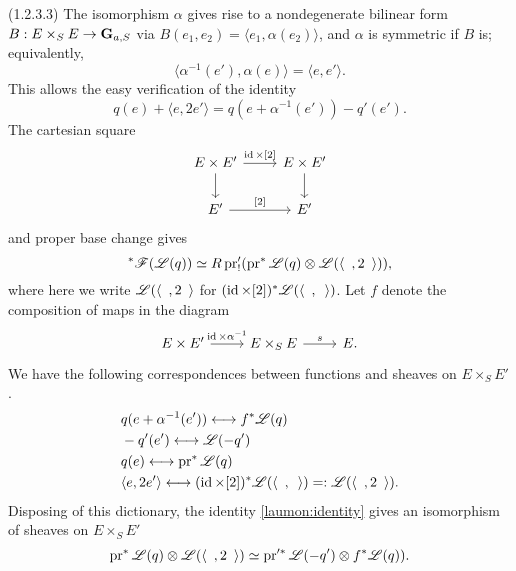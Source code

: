 \documentclass[deligne.tex]{subfiles}
\begin{document}
(1.2.3.3)
The isomorphism $\alpha$ gives rise to a nondegenerate bilinear form
$B:E\times_S E\rightarrow\mathbf{G}_{a,S}$ via $B(e_1,e_2)=\langle e_1,\alpha(e_2)\rangle$,
and $\alpha$ is symmetric if $B$ is; equivalently,
\begin{equation*}
	\langle \alpha^{-1}(e'),\alpha(e)\rangle=\langle e,e'\rangle.
\end{equation*}
This allows the easy verification of the identity
\begin{equation*}\label{laumon:identity}\tag{$\dagger$}
	q(e)+\langle e,2e'\rangle=q(e+\alpha^{-1}(e'))-q'(e').
\end{equation*}
The cartesian square
\begin{equation*}\begin{tikzcd}
	E\times E'\arrow[r,"{\id\times[2]}"]\arrow[d]&E\times E'\arrow[d] \\
	E'\arrow[r,"{[2]}"]&E'
\end{tikzcd}\end{equation*}
and proper base change gives
\begin{equation*}
	[2]^*\mathscr F(\mathscr L(q))\simeq
	R\pr_!'(\pr^*\mathscr L(q)\otimes\mathscr L(\langle\enskip,2\enskip\rangle)),
\end{equation*}
where here we write $\mathscr L(\langle\enskip,2\enskip\rangle$ for
$(\operatorname{id}\times[2])^*\mathscr L(\langle\enskip,\enskip\rangle)$.
Let $f$ denote the composition of maps in the diagram
\begin{equation*}\begin{tikzcd}
	E\times E'\arrow[r,"\id\times\alpha^{-1}"]&E\times_SE\arrow[r,"s"]&E.
\end{tikzcd}\end{equation*}
We have the following correspondences between functions and sheaves on
$E\times_SE'$.
\begin{align*}
	&q(e+\alpha^{-1}(e'))\longleftrightarrow f^*\mathscr L(q) \\
	&-q'(e')\longleftrightarrow\mathscr L(-q') \\
	&q(e)\longleftrightarrow\operatorname{pr}^*\mathscr L(q) \\
	&\langle e,2e'\rangle\longleftrightarrow(\operatorname{id}\times[2])^*\mathscr L(\langle\enskip,\enskip\rangle)=:\mathscr L(\langle\enskip,2\enskip\rangle).
\end{align*}
Disposing of this dictionary, the identity \eqref{laumon:identity} gives an 
isomorphism of sheaves on $E\times_SE'$
\begin{equation*}
	\operatorname{pr}^*\mathscr L(q)\otimes\mathscr L(\langle\enskip,2\enskip\rangle)
	\simeq\operatorname{pr}'^*\mathscr L(-q')\otimes f^*\mathscr L(q)).
\end{equation*}
\end{document}
